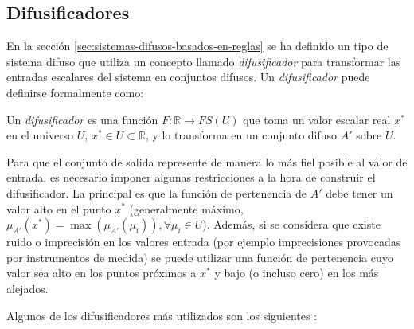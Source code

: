 \subsection{Difusificadores}

En la sección \ref{sec:sistemas-difusos-basados-en-reglas} se ha definido un tipo de sistema difuso que utiliza un concepto llamado \emph{difusificador} para transformar las entradas escalares del sistema en conjuntos difusos. Un \emph{difusificador} puede definirse formalmente como:

\begin{definition}\label{def:difusificador}
Un \emph{difusificador} es una función $F:\mathbb{R} \rightarrow FS(U)$ que toma un valor escalar real $x^{*}$ en el universo $U$, $x^{*}\in U \subset \mathbb{R}$, y lo transforma en un conjunto difuso $A'$ sobre $U$.
\end{definition}

Para que el conjunto de salida represente de manera lo más fiel posible al valor de entrada, es necesario imponer algunas restricciones a la hora de construir el difusificador. La principal es que la función de pertenencia de $A'$ debe tener un valor alto en el punto $x^*$ (generalmente máximo, $\mu_{A'}(x^*) = \max(\mu_{A'}(\mu_{i})),\forall \mu_{i} \in U$). Además, si se considera que existe ruido o imprecisión en los valores entrada (por ejemplo imprecisiones provocadas por instrumentos de medida) se puede utilizar una función de pertenencia cuyo valor sea alto en los puntos próximos a $x^*$ y bajo (o incluso cero) en los más alejados.

Algunos de los difusificadores más utilizados son los siguientes \cite{wang1997}:

